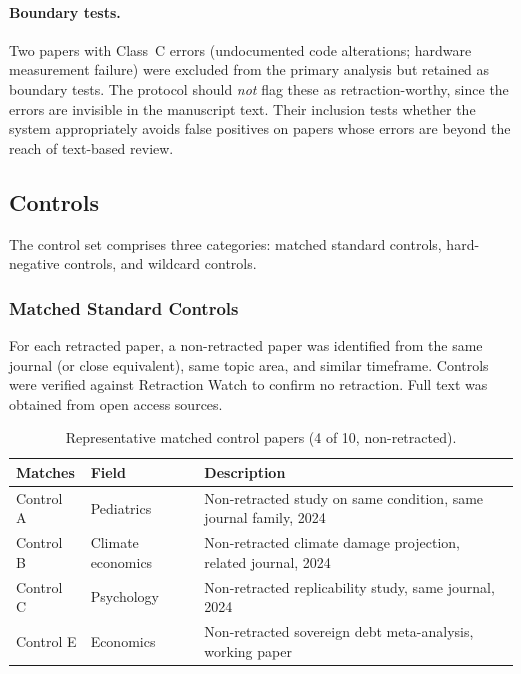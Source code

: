 \documentclass[11pt]{article}
\begin{document}
\paragraph{Boundary tests.} Two papers with Class~C errors (undocumented code alterations; hardware measurement failure) were excluded from the primary analysis but retained as boundary tests. The protocol should \emph{not} flag these as retraction-worthy, since the errors are invisible in the manuscript text. Their inclusion tests whether the system appropriately avoids false positives on papers whose errors are beyond the reach of text-based review.

\subsection{Controls}
\label{sec:controls}

The control set comprises three categories: matched standard controls, hard-negative controls, and wildcard controls.

\subsubsection{Matched Standard Controls}

For each retracted paper, a non-retracted paper was identified from the same journal (or close equivalent), same topic area, and similar timeframe. Controls were verified against Retraction Watch to confirm no retraction. Full text was obtained from open access sources.

\begin{table}[h]
\centering
\caption{Representative matched control papers (4 of 10, non-retracted).}
\label{tab:controls}
\small
\begin{tabular}{p{2cm}p{2.5cm}p{6cm}}
\toprule
\textbf{Matches} & \textbf{Field} & \textbf{Description} \\
\midrule
Control A & Pediatrics & Non-retracted study on same condition, same journal family, 2024 \\
Control B & Climate economics & Non-retracted climate damage projection, related journal, 2024 \\
Control C & Psychology & Non-retracted replicability study, same journal, 2024 \\
Control E & Economics & Non-retracted sovereign debt meta-analysis, working paper \\
\bottomrule
\end{tabular}
\end{table}
\end{document}
